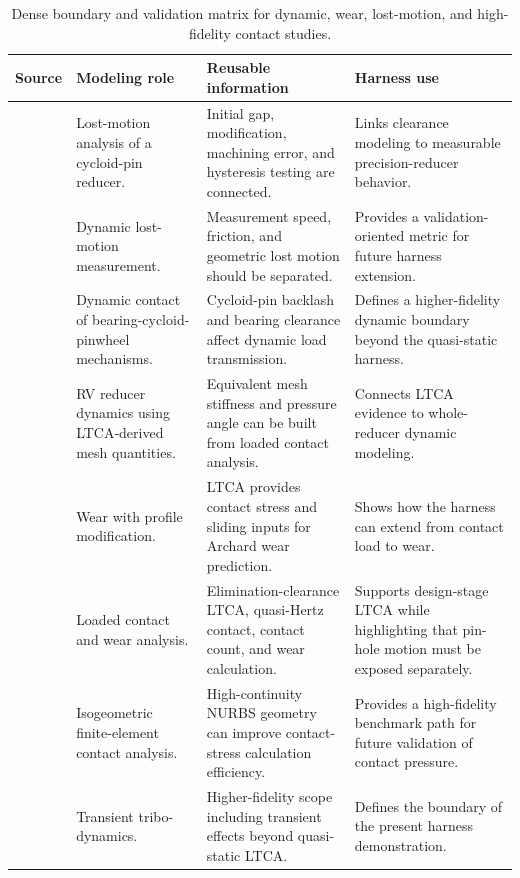 \documentclass{article}
\begin{document}
\begin{table}[t]
\caption{Dense boundary and validation matrix for dynamic, wear, lost-motion, and high-fidelity contact studies.}
\centering
\small
\begin{tabular}{p{2.7cm}p{3.0cm}p{3.7cm}p{3.8cm}}
\toprule
\textbf{Source} & \textbf{Modeling role} & \textbf{Reusable information} & \textbf{Harness use} \\
\midrule
\citet{sun2018lostmotion} & Lost-motion analysis of a cycloid-pin reducer. & Initial gap, modification, machining error, and hysteresis testing are connected. & Links clearance modeling to measurable precision-reducer behavior. \\
\citet{xu2019lostmotion} & Dynamic lost-motion measurement. & Measurement speed, friction, and geometric lost motion should be separated. & Provides a validation-oriented metric for future harness extension. \\
\citet{xu2019bcptm} & Dynamic contact of bearing-cycloid-pinwheel mechanisms. & Cycloid-pin backlash and bearing clearance affect dynamic load transmission. & Defines a higher-fidelity dynamic boundary beyond the quasi-static harness. \\
\citet{li2023dynamicrv} & RV reducer dynamics using LTCA-derived mesh quantities. & Equivalent mesh stiffness and pressure angle can be built from loaded contact analysis. & Connects LTCA evidence to whole-reducer dynamic modeling. \\
\citet{li2023wearprofile} & Wear with profile modification. & LTCA provides contact stress and sliding inputs for Archard wear prediction. & Shows how the harness can extend from contact load to wear. \\
\citet{wang2023ltca} & Loaded contact and wear analysis. & Elimination-clearance LTCA, quasi-Hertz contact, contact count, and wear calculation. & Supports design-stage LTCA while highlighting that pin-hole motion must be exposed separately. \\
\citet{zhang2023iga} & Isogeometric finite-element contact analysis. & High-continuity NURBS geometry can improve contact-stress calculation efficiency. & Provides a high-fidelity benchmark path for future validation of contact pressure. \\
\citet{li2025tribodynamics} & Transient tribo-dynamics. & Higher-fidelity scope including transient effects beyond quasi-static LTCA. & Defines the boundary of the present harness demonstration. \\
\bottomrule
\end{tabular}
\label{tab:boundary_matrix}
\end{table}
\end{document}
